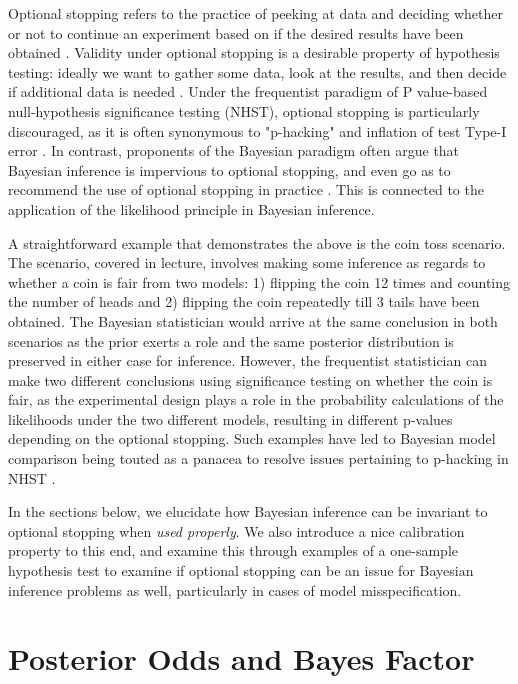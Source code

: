 \documentclass{article}
\begin{document}
Optional stopping refers to the practice of peeking at data and deciding whether or not to continue an experiment based on if the desired results have been obtained \cite{rounder}. Validity under optional stopping is a desirable property of hypothesis testing: ideally we want to gather some data, look at the results, and then decide if additional data is needed \cite{rounder}. Under the frequentist paradigm of P value-based null-hypothesis significance testing (NHST), optional stopping is particularly discouraged, as it is often synonymous to "p-hacking" and inflation of test Type-I error \cite{rounder}. In contrast, proponents of the Bayesian paradigm often argue that Bayesian inference is impervious to optional stopping, and even go as to recommend the use of optional stopping in practice \cite{rounder}. This is connected to the application of the likelihood principle in Bayesian inference. 

A straightforward example that demonstrates the above is the coin toss scenario. The scenario, covered in lecture, involves making some inference as regards to whether a coin is fair from two models: 1) flipping the coin 12 times and counting the number of heads and 2) flipping the coin repeatedly till 3 tails have been obtained. The Bayesian statistician would arrive at the same conclusion in both scenarios as the prior exerts a role and the same posterior distribution is preserved in either case for inference. However, the frequentist statistician can make two different conclusions using significance testing on whether the coin is fair, as the experimental design plays a role in the probability calculations of the likelihoods under the two different models, resulting in different p-values depending on the optional stopping. Such examples have led to Bayesian model comparison being touted as a panacea to resolve issues pertaining to p-hacking in NHST \cite{deng}.

In the sections below, we elucidate how Bayesian inference can be invariant to optional stopping when \textit{used properly}. We also introduce a nice calibration property to this end, and examine this through examples of a one-sample hypothesis test to examine if optional stopping can be an issue for Bayesian inference problems as well, particularly in cases of model misspecification. 

\section{Posterior Odds and Bayes Factor}
\end{document}
